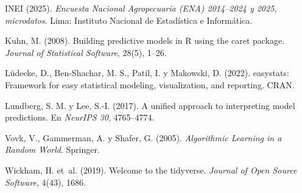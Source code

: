 \documentclass[letterpaper]{report}
\begin{document}
\begin{article}
\begin{thebibliography}{99}
 INEI (2025). \emph{Encuesta Nacional Agropecuaria (ENA) 2014--2024 y 2025, microdatos}. Lima: Instituto Nacional de Estadística e Informática.

 Kuhn, M. (2008). Building predictive models in R using the caret package. \emph{Journal of Statistical Software}, 28(5), 1--26.

 Lüdecke, D., Ben-Shachar, M. S., Patil, I. y Makowski, D. (2022). easystats: Framework for easy statistical modeling, visualization, and reporting. CRAN.

 Lundberg, S. M. y Lee, S.-I. (2017). A unified approach to interpreting model predictions. En \emph{NeurIPS 30}, 4765--4774.

 Vovk, V., Gammerman, A. y Shafer, G. (2005). \emph{Algorithmic Learning in a Random World}. Springer.

 Wickham, H. et~al. (2019). Welcome to the tidyverse. \emph{Journal of Open Source Software}, 4(43), 1686.
\end{thebibliography}

\par\address{Rodrigo Claudio Rosas Tuni\\ Facultad de Ingeniería Estadística e Informática (FINESI)\\ Universidad Nacional del Altiplano, Puno, Perú}
\end{article}
\end{document}
